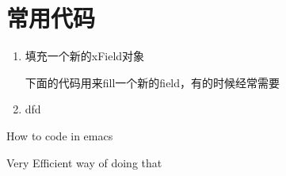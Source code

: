 \documentclass{article}
\begin{document}
\begin{enumerate}
\end{enumerate}

\section{常用代码}
\label{sec:utility-codes}

\begin{enumerate}
\item 填充一个新的xField对象

下面的代码用来fill一个新的field，有的时候经常需要



\item dfd

\end{enumerate}


\begin{inparaenum}[(i)]
\item How to code in emacs
\item Very Efficient way of doing that
\end{inparaenum}
\end{document}
